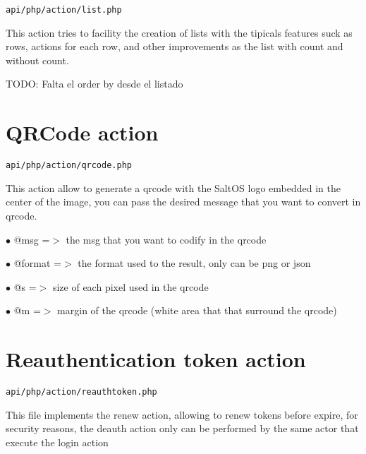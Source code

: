 \documentclass[a4paper]{book}
\begin{document}
\begin{lstlisting}
api/php/action/list.php
\end{lstlisting}

This action tries to facility the creation of lists with the tipicals
features suck as rows, actions for each row, and other improvements as
the list with count and without count.

TODO: Falta el order by desde el listado

\hypertarget{toc16}{}
\section{QRCode action}

\begin{lstlisting}
api/php/action/qrcode.php
\end{lstlisting}

This action allow to generate a qrcode with the SaltOS logo embedded
in the center of the image, you can pass the desired message that you
want to convert in qrcode.

\begin{compactitem}
\item[\color{myblue}$\bullet$] @msg    =$>$ the msg that you want to codify in the qrcode
\item[\color{myblue}$\bullet$] @format =$>$ the format used to the result, only can be png or json
\end{compactitem}

\begin{compactitem}
\item[\color{myblue}$\bullet$] @s =$>$ size of each pixel used in the qrcode
\item[\color{myblue}$\bullet$] @m =$>$ margin of the qrcode (white area that that surround the qrcode)
\end{compactitem}

\hypertarget{toc17}{}
\section{Reauthentication token action}

\begin{lstlisting}
api/php/action/reauthtoken.php
\end{lstlisting}

This file implements the renew action, allowing to renew tokens before
expire, for security reasons, the deauth action only can be performed by
the same actor that execute the login action
\end{document}
